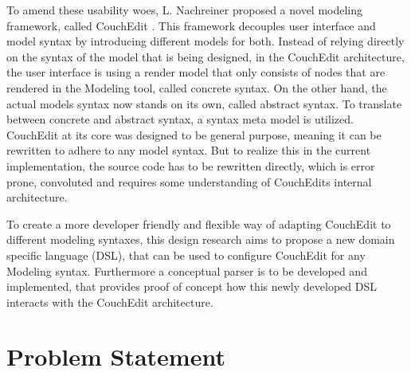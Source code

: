 \documentclass[10pt,a4paper,oneside]{scrartcl}
\newcommand\hint[2]{
\ifthenelse{\boolean{showhints}}{
\begin{center}
\colorbox{black!10}{
\begin{minipage}{.963\textwidth}
#2\hfill\textbf{#1}
\end{minipage}
}\end{center}}{}
}
\begin{document}
To amend these usability woes, L. Nachreiner proposed a novel modeling framework, called CouchEdit \cite{nachreiner_couchedit_2020}. This framework decouples user interface and model syntax by introducing different models for both. Instead of relying directly on the syntax of the model that is being designed, in the CouchEdit architecture, the user interface is using a render model that only consists of nodes that are rendered in the Modeling tool, called concrete syntax. On the other hand, the actual models syntax now stands on its own, called abstract syntax. To translate between concrete and abstract syntax, a syntax meta model is utilized. CouchEdit at its core was designed to be general purpose, meaning it can be rewritten to adhere to any model syntax. But to realize this in the current implementation, the source code has to be rewritten directly, which is error prone, convoluted and requires some understanding of CouchEdits internal architecture.

To create a more developer friendly and flexible way of adapting CouchEdit to different modeling syntaxes, this design research aims to propose a new
domain specific language (DSL), that can be used to configure CouchEdit for
any Modeling syntax. Furthermore a conceptual parser is to be developed and implemented, that provides proof of concept how this newly developed DSL interacts with the CouchEdit architecture.

\section{Problem Statement}
\label{sec:problem_statement}


\end{document}
